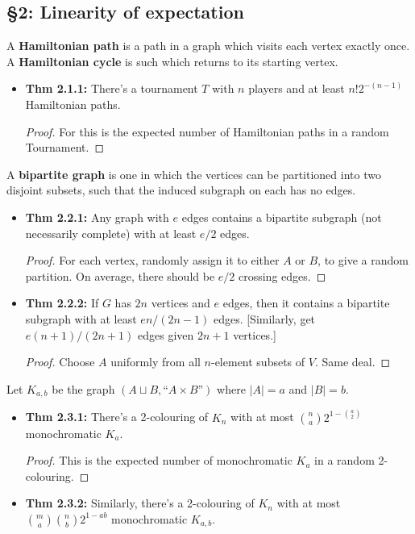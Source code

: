 \documentclass[11pt]{article}
\newenvironment{INT}[1][]{\begin{itemize}\small\item\textbf{#1}}{\end{itemize}}
\newcommand{\moreINT}[1][]{\item\textbf{#1}}
\begin{document}
\begin{chapter2}
\section*{\S2: Linearity of expectation}
\begin{itemise}
\item A \textbf{Hamiltonian path} is a path in a graph which visits each vertex exactly once. A \textbf{Hamiltonian cycle} is such which returns to its starting vertex.
\begin{INT}[Thm 2.1.1:]
There's a tournament $T$ with $n$ players and at least $n!2^{-(n-1)}$ Hamiltonian paths.
\begin{proof}
For this is the expected number of Hamiltonian paths in a random Tournament.
\end{proof}
\end{INT}
\item A \textbf{bipartite graph} is one in which the vertices can be partitioned into two disjoint subsets, such that the induced subgraph on each has no edges.
\begin{INT}[Thm 2.2.1:]
Any graph with $e$ edges contains a bipartite subgraph (not necessarily complete) with at least $e/2$ edges.
\begin{proof}
For each vertex, randomly assign it to either $A$ or $B$, to give a random partition. On average, there should be $e/2$ crossing edges.
\end{proof}
\moreINT[Thm 2.2.2:]
If $G$ has $2n$ vertices and $e$ edges, then it contains a bipartite subgraph with at least $en/(2n-1)$ edges. [Similarly, get $e(n+1)/(2n+1)$ edges given $2n+1$ vertices.]
\begin{proof}
Choose $A$ uniformly from all $n$-element subsets of $V$. Same deal.
\end{proof}
\end{INT}
\item {}
\item Let $K_{a,b}$ be the graph $(A\sqcup B,\text{``$A\times B$''})$ where $|A|=a$ and $|B|=b$.
\begin{INT}[Thm 2.3.1:]
There's a 2-colouring of $K_n$ with at most ${n\choose a}2^{1-{a\choose 2}}$ monochromatic $K_a$.
\begin{proof}
This is the expected number of monochromatic $K_a$ in a random 2-colouring.
\end{proof}
\moreINT[Thm 2.3.2:] Similarly, there's a 2-colouring of $K_n$ with at most ${m\choose a}{n\choose b}2^{1-ab}$ monochromatic $K_{a,b}$.

\end{INT}
\end{itemise}
\end{chapter2}
\end{document}
